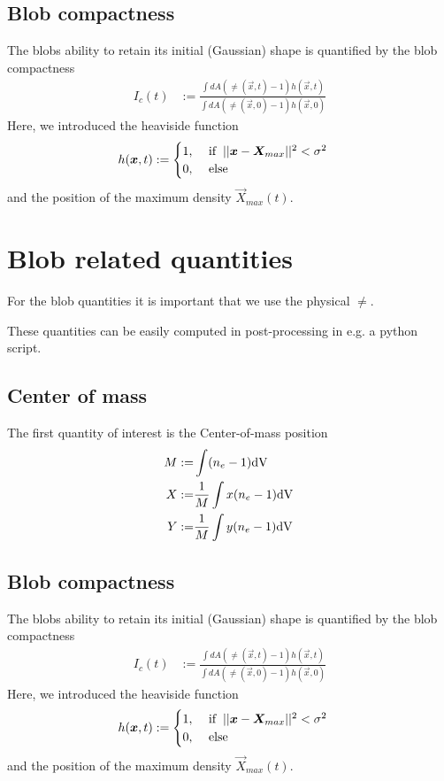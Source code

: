 \subsection{Blob compactness}
The blobs ability to retain its initial (Gaussian) shape is quantified by the  blob compactness
\begin{align}
     I_c(t) &:= \frac{\int dA (\ne(\vec{x},t)-1) h(\vec{x},t)}{\int dA
(\ne(\vec{x},0)-1) h(\vec{x},0)}
\end{align}
Here, we introduced the heaviside function
\begin{align}
     h(\vec{x},t) &:= \begin{cases}
          1,
        &\ \text{if} \hspace{2mm}||\vec{x} - \vec{X}_{max}||^2 < \sigma^2 \\
0,  &\ \text{else}
           \end{cases} \nonumber
\end{align}
and the position of the maximum density \( \vec{X}_{max}(t)\).


\section{Blob related quantities}
For the blob quantities it is important that we use the physical $\ne$.
\begin{tcolorbox}[title=Note]
    These quantities can be easily computed in post-processing in e.g. a python script.
\end{tcolorbox}

\subsection{Center of mass}
The first quantity of interest is the Center-of-mass position
\begin{align}
    M :=& \int (\ne -1 ) \dV \\
    X :=& \frac{1}{M} \int x(\ne - 1) \dV \\
    Y :=& \frac{1}{M} \int y(\ne - 1) \dV
\end{align}
\subsection{Blob compactness}
The blobs ability to retain its initial (Gaussian) shape is quantified by the  blob compactness
\begin{align}
     I_c(t) &:= \frac{\int dA (\ne(\vec{x},t)-1) h(\vec{x},t)}{\int dA
(\ne(\vec{x},0)-1) h(\vec{x},0)}
\end{align}
Here, we introduced the heaviside function
\begin{align}
     h(\vec{x},t) &:= \begin{cases}
          1,
        &\ \text{if} \hspace{2mm}||\vec{x} - \vec{X}_{max}||^2 < \sigma^2 \\
0,  &\ \text{else}
           \end{cases} \nonumber
\end{align}
and the position of the maximum density \( \vec{X}_{max}(t)\).






